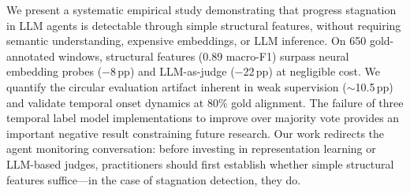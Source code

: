 \documentclass[11pt,a4paper]{article}
\begin{document}
We present a systematic empirical study demonstrating that progress stagnation in LLM agents is detectable through simple structural features, without requiring semantic understanding, expensive embeddings, or LLM inference.
On 650 gold-annotated windows, structural features (0.89 macro-F1) surpass neural embedding probes ($-$8\,pp) and LLM-as-judge ($-$22\,pp) at negligible cost.
We quantify the circular evaluation artifact inherent in weak supervision ($\sim$10.5\,pp) and validate temporal onset dynamics at 80\% gold alignment.
The failure of three temporal label model implementations to improve over majority vote provides an important negative result constraining future research.
Our work redirects the agent monitoring conversation: before investing in representation learning or LLM-based judges, practitioners should first establish whether simple structural features suffice---in the case of stagnation detection, they do.
\end{document}
